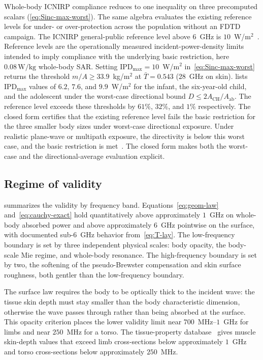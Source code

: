 \documentclass[journal,twocolumn,10pt]{IEEEtran}
\theoremstyle{plain}
\newcommand{\IPD}{\mathrm{IPD}}
\newcommand{\Aab}{A_{\mathrm{ab}}}
\newcommand{\Tbar}{\bar{T}}
\begin{document}
Whole-body ICNIRP compliance reduces to one inequality on three
precomputed scalars (\cref{eq:Sinc-max-worst}). The same algebra
evaluates the existing reference levels for under- or over-protection
across the population without an FDTD campaign. The ICNIRP
general-public reference level above $6$~GHz is
$10$~W/m$^2$~\cite{ICNIRP2020}. Reference levels are the
operationally measured incident-power-density limits intended to
imply compliance with the underlying basic restriction, here
$0.08\,\mathrm{W/kg}$ whole-body SAR. Setting $\IPD_{\mathrm{max}} =
10$~W/m$^2$ in~\eqref{eq:Sinc-max-worst} returns the threshold
$m/A \geq 33.9$~kg/m$^2$ at $\Tbar = 0.543$ ($28$~GHz on skin).
 lists $\IPD_{\mathrm{max}}$ values of $6.2$,
$7.6$, and $9.9$~W/m$^2$ for the infant, the six-year-old child, and
the adolescent under the worst-case directional bound
$D \le 2A_{\mathrm{CH}}/\Aab$. The reference level exceeds these
thresholds by $61\%$, $32\%$, and $1\%$ respectively. The closed form
certifies that the existing reference level fails the basic
restriction for the three smaller body sizes under worst-case
directional exposure. Under realistic plane-wave or multipath
exposure, the directivity is below this worst case, and the basic
restriction is met~\cite{ICNIRP2020}. The closed form makes both the
worst-case and the directional-average evaluation explicit.

\subsection{Regime of validity}\label{subsec:disc-validity}

 summarizes the validity by frequency band.
Equations~\eqref{eq:geom-law} and~\eqref{eq:cauchy-exact} hold
quantitatively above approximately $1$~GHz on whole-body absorbed
power and above approximately $6$~GHz pointwise on the surface, with
documented sub-$6$~GHz behavior from~\eqref{eq:T-lay}. The
low-frequency boundary is set by three independent physical scales:
body opacity, the body-scale Mie regime, and whole-body resonance.
The high-frequency boundary is set by two, the softening of the
pseudo-Brewster compensation and skin surface roughness, both gentler
than the low-frequency boundary.

The surface law requires the body to be optically thick to the
incident wave: the tissue skin depth must stay smaller than the body
characteristic dimension, otherwise the wave passes through rather
than being absorbed at the surface. This opacity criterion places
the lower validity limit near $700$~MHz--$1$~GHz for limbs and near
$250$~MHz for a torso. The tissue-property
database~\cite{Gabriel1996} gives muscle skin-depth values that
exceed limb cross-sections below approximately $1$~GHz and torso
cross-sections below approximately $250$~MHz.
\end{document}
